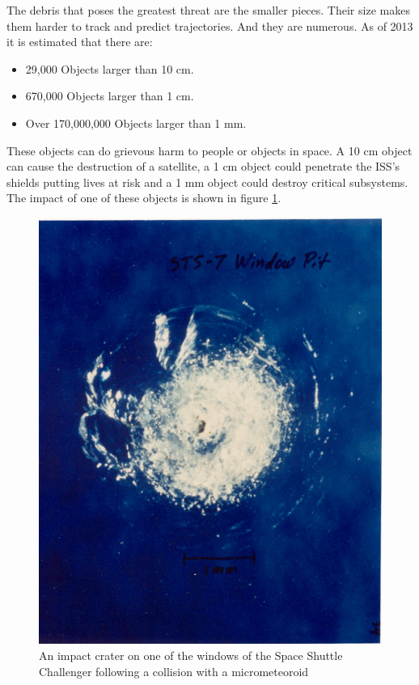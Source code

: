 \documentclass[12pt]{article}
\begin{document}
	The debris that poses the greatest threat are the smaller pieces. Their size makes them harder to track and predict trajectories. And they are numerous. As of 2013 it is estimated that there are:\par 

	
	\begin{itemize}\singlespacing
		\item 	29,000 Objects larger than 10 cm.
		\item 	670,000 Objects larger than 1 cm.
		\item 	Over 170,000,000 Objects larger than 1 mm.
	\end{itemize}	\doublespacing
	
	These objects can do grievous harm to people or objects in space. A 10 cm object can cause the destruction of a satellite, a 1 cm object could penetrate the ISS's shields putting lives at risk and a 1 mm object could destroy critical subsystems.\cite{sdor2014} The impact of one of these objects is shown in figure \ref{fig:sts7crack}.
	
	
	
	\begin{figure}
		\centering
		\includegraphics[width=0.7\linewidth]{sts7crack}
		\caption{An impact crater on one of the windows of the Space Shuttle Challenger following a collision with a micrometeoroid\cite{stscrack}}
		\label{fig:sts7crack}
	\end{figure}
\end{document}
